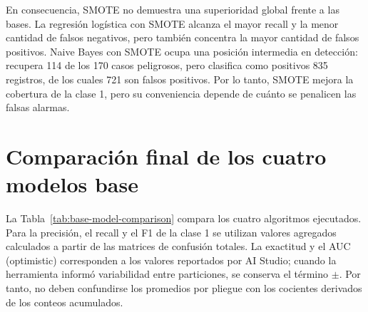 \documentclass[12pt,a4paper]{article}
\begin{document}
En consecuencia, SMOTE no demuestra una superioridad global frente a las bases. La regresión logística con SMOTE alcanza el mayor recall y la menor cantidad de falsos negativos, pero también concentra la mayor cantidad de falsos positivos. Naive Bayes con SMOTE ocupa una posición intermedia en detección: recupera 114 de los 170 casos peligrosos, pero clasifica como positivos 835 registros, de los cuales 721 son falsos positivos. Por lo tanto, SMOTE mejora la cobertura de la clase 1, pero su conveniencia depende de cuánto se penalicen las falsas alarmas.

\section{Comparación final de los cuatro modelos base}
La Tabla~\ref{tab:base-model-comparison} compara los cuatro algoritmos ejecutados. Para la precisión, el recall y el F1 de la clase 1 se utilizan valores agregados calculados a partir de las matrices de confusión totales. La exactitud y el AUC (optimistic) corresponden a los valores reportados por AI Studio; cuando la herramienta informó variabilidad entre particiones, se conserva el término $\pm$. Por tanto, no deben confundirse los promedios por pliegue con los cocientes derivados de los conteos acumulados.

\begin{table}[H]
\centering
\caption{Comparación final de los cuatro modelos base.}
\label{tab:base-model-comparison}
\small
{}
\end{table}
\end{document}
